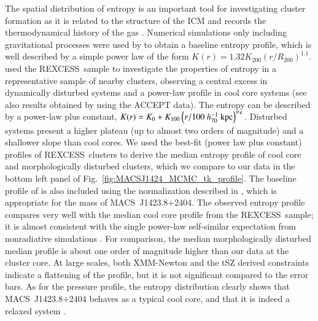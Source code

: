 \documentclass[traditabstract]{aa}
\newcommand{\rexcess}{{\gwpfont REXCESS}}
\begin{document}
The spatial distribution of entropy is an important tool for investigating cluster formation as it is related to the structure of the ICM and records the thermodynamical history of the gas \citep[see][for a review]{voit2005}. Numerical simulations only including gravitational processes were used by \cite{voit2005b} to obtain a baseline entropy profile, which is well described by a simple power law of the form $K(r) = 1.32 K_{200} \left(r/R_{200}\right)^{1.1}$. \cite{pratt2010}  used the \rexcess\ sample to investigate the properties of entropy in a representative sample of nearby clusters, observing a central excess in dynamically disturbed systems and a power-law profile in cool core systems (see also results obtained by \cite{cavagnolo2009} using the ACCEPT data). The entropy can be described by a power-law plus constant, $K(r) = K_0+K_{100} \left(r/100 \ h_{70}^{-1} \ {\rm kpc}\right)^{\alpha_{K}}$. Disturbed systems present a higher plateau (up to almost two orders of magnitude) and a shallower slope than cool cores. We used the best-fit (power law plus constant) profiles of \rexcess\ clusters \citep[see Tab.~3 of][]{pratt2010} to derive the median entropy profile of cool core and morphologically disturbed clusters, which we compare to our data in the bottom left panel of Fig.~\ref{fig:MACSJ1424_MCMC_tk_profile}. The baseline profile of \cite{voit2005b} is also included using the normalization described in \cite{pratt2010}, which is appropriate for the mass of \mbox{MACS~J1423.8+2404}. The observed entropy profile compares very well with the median cool core profile from the \rexcess\ sample; it is almost consistent with the single power-law self-similar expectation from nonradiative simulations \citep{voit2005b}. For comparison, the median morphologically disturbed median profile is about one order of magnitude higher than our data at the cluster core. At large scales, both XMM-Newton and the tSZ derived constraints indicate a flattening of the profile, but it is not significant compared to the error bars. As for the pressure profile, the entropy distribution clearly shows that \mbox{MACS~J1423.8+2404} behaves as a typical cool core, and that it is indeed a relaxed system \citep[as discussed in Sect.~\ref{sec:Introduction}, e.g.,][]{kartaltepe2008,limousin2010}. 
\end{document}
